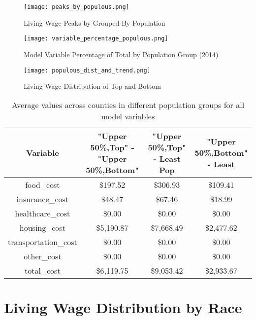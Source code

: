 \begin{figure}[H]
    \centering
        \texttt{[image: peaks\_by\_populous.png]}
        \caption{Living Wage Peaks by Grouped By Population}
    \label{f:ch4_peaks_by_populous}
\end{figure}

\begin{figure}[H]
    \centering
        \texttt{[image: variable\_percentage\_populous.png]}
        \caption{Model Variable Percentage of Total by Population Group (2014)}
    \label{f:ch4_variable_percentage_populous}
\end{figure}

\begin{figure}[H]
    \centering
        \texttt{[image: populous\_dist\_and\_trend.png]}
        \caption{Living Wage Distribution of Top and Bottom }
    \label{f:ch4_populous_dist_and_trend}
\end{figure}

\begin{table}[H]
\footnotesize
\centering
 \begin{tabular}{||c c c c||} 
 \hline
 Variable & "Upper 50\%,Top" - "Upper 50\%,Bottom" & "Upper 50\%,Top" - Least Pop & "Upper 50\%,Bottom" - Least\\ [0.1ex] 
 \hline\hline
 food\_cost & \$197.52 & \$306.93 & \$109.41 \\ 
 insurance\_cost & \$48.47 & \$67.46 & \$18.99 \\
 healthcare\_cost & \$0.00 &	\$0.00 & \$0.00 \\
 housing\_cost &	\$5,190.87 &	\$7,668.49 &	 \$2,477.62 \\
 transportation\_cost & \$0.00 & \$0.00 & \$0.00 \\
 other\_cost & \$0.00 & \$0.00 & \$0.00 \\
 total\_cost & \$6,119.75 & \$9,053.42 & \$2,933.67 \\ [1ex] 
 \hline
 \end{tabular}
 \caption{Average values across counties in different population groups for all model variables}
 \label{tab:ch4_table_variable_delta_by_population}
\end{table}




\section{Living Wage Distribution by Race}

